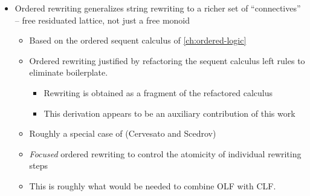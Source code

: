\begin{itemize}
\item
  Ordered rewriting generalizes string rewriting to a richer set of \enquote{connectives} -- free residuated lattice, not just a free monoid
  \begin{itemize}[nosep]
  \item Based on the ordered sequent calculus of \cref{ch:ordered-logic}
  \item Ordered rewriting justified by refactoring the sequent calculus left rules to eliminate boilerplate.
    \begin{itemize}[nosep]
    \item Rewriting is obtained as a fragment of the refactored calculus
    \item This derivation appears to be an auxiliary contribution of this work
    \end{itemize}
  \item Roughly a special case of (Cervesato and Scedrov)
  \item \emph{Focused} ordered rewriting to control the atomicity of individual rewriting steps
  \item This is roughly what would be needed to combine OLF with CLF.
  \end{itemize}


\end{itemize}

